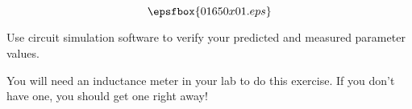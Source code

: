 

$$\epsfbox{01650x01.eps}$$

\vfil \eject






Use circuit simulation software to verify your predicted and measured parameter values.







You will need an inductance meter in your lab to do this exercise.  If you don't have one, you should get one right away!




